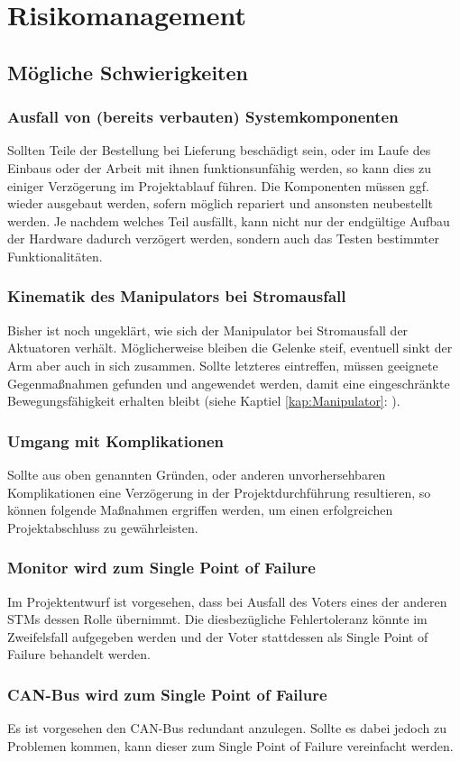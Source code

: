 \section{Risikomanagement}
\label{Risikomanagement}
\subsection{Mögliche Schwierigkeiten}
\subsubsection{Ausfall von (bereits verbauten) Systemkomponenten}
Sollten Teile der Bestellung bei Lieferung beschädigt sein, oder im Laufe des Einbaus oder der Arbeit mit ihnen funktionsunfähig werden, so kann dies zu einiger Verzögerung im Projektablauf führen. Die Komponenten müssen ggf. wieder ausgebaut werden, sofern möglich repariert und ansonsten neubestellt werden. Je nachdem welches Teil ausfällt, kann nicht nur der endgültige Aufbau der Hardware dadurch verzögert werden, sondern auch das Testen bestimmter Funktionalitäten.

\subsubsection{Kinematik des Manipulators bei Stromausfall}
Bisher ist noch ungeklärt, wie sich der Manipulator bei Stromausfall der Aktuatoren verhält. Möglicherweise bleiben die Gelenke steif, eventuell sinkt der Arm aber auch in sich zusammen. Sollte letzteres eintreffen, müssen geeignete Gegenmaßnahmen gefunden und angewendet werden, damit eine eingeschränkte Bewegungsfähigkeit erhalten bleibt (siehe Kaptiel \ref{kap:Manipulator}: ).

\subsubsection{Umgang mit Komplikationen}
Sollte aus oben genannten Gründen, oder anderen unvorhersehbaren Komplikationen eine Verzögerung in der  Projektdurchführung resultieren, so können folgende Maßnahmen ergriffen werden, um einen erfolgreichen Projektabschluss zu gewährleisten.

\subsubsection{Monitor wird zum Single Point of Failure}
Im Projektentwurf ist vorgesehen, dass bei Ausfall des Voters eines der anderen STMs dessen Rolle übernimmt. Die diesbezügliche Fehlertoleranz könnte im Zweifelsfall aufgegeben werden und der Voter stattdessen als Single Point of Failure behandelt werden.

\subsubsection{CAN-Bus wird zum Single Point of Failure}
Es ist vorgesehen den CAN-Bus redundant anzulegen. Sollte es dabei jedoch zu Problemen kommen, kann dieser zum Single Point of Failure vereinfacht werden.